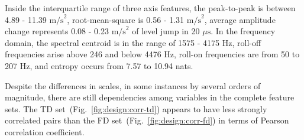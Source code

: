 Inside the interquartile range of three axis features, the peak-to-peak is between 4.89 - 11.39 $\mathrm{m/s}^2$, root-mean-square is 0.56 - 1.31 $\mathrm{m/s}^2$, average amplitude change represents 0.08 - 0.23 $\mathrm{m/s}^2$ of level jump in 20 $\mu\mathrm{s}$. In the frequency domain, the spectral centroid is in the range of 1575 - 4175 Hz, roll-off frequencies arise above 246 and below 4476 Hz, roll-on frequencies are from 50 to 207 Hz, and entropy occurs from 7.57 to 10.94 nats.

Despite the differences in scales, in some instances by several orders of magnitude, there are still dependencies among variables in the complete feature sets. The TD set~(Fig.~\ref{fig:design:corr-td}) appears to have less strongly correlated pairs than the FD set~(Fig.~\ref{fig:design:corr-fd}) in terms of Pearson correlation coefficient. 

